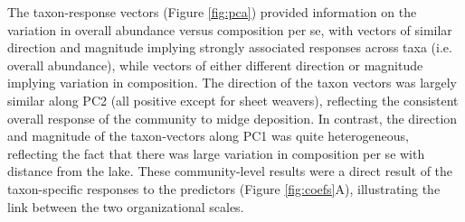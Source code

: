 The taxon-response vectors (Figure \ref{fig:pca})
provided information on the variation in overall abundance versus composition per se,
with vectors of similar direction and magnitude
implying strongly associated responses across taxa (i.e. overall abundance),
while vectors of either different direction or magnitude implying
variation in composition.
The direction of the taxon vectors was largely similar along PC2 (all positive
except for sheet weavers), reflecting the consistent overall
response of the community to midge deposition.
In contrast, the direction and magnitude
of the taxon-vectors along PC1 was quite heterogeneous,
reflecting the fact that there was large variation in composition per se with
distance from the lake.
These community-level results were a direct result of the taxon-specific responses
to the predictors (Figure \ref{fig:coefs}A),
illustrating the link between the two organizational scales.
